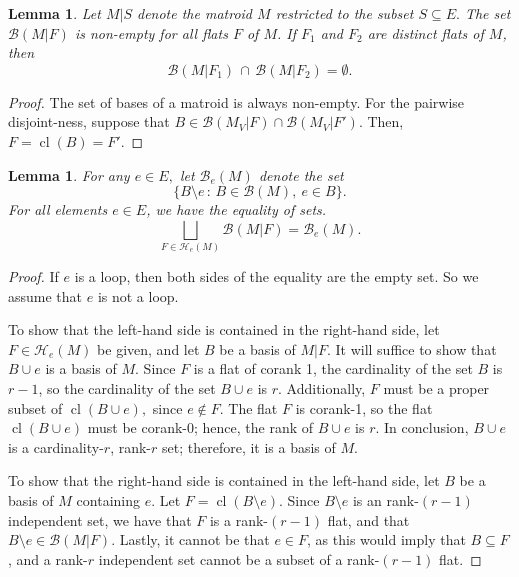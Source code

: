 \documentclass{amsart}
\theoremstyle{plain}
\newtheorem{lemma}[theorem]{Lemma}
\theoremstyle{definition}
\newcommand{\cl}{\operatorname{cl}}
\begin{document}
\begin{lemma}
\label{lem:matroid_pairwise_disjoint}
Let $M | S$ denote the matroid $M$ restricted to the subset $S \subseteq E.$ The set $\mathcal{B}(M|F)$ is non-empty for all flats $F$ of $M$.
If $F_1$ and $F_2$ are distinct flats of $M$, then
\[\mathcal{B}(M | F_1) \, \cap \, \mathcal{B}(M | F_2) = \emptyset.\]
\end{lemma}

\begin{proof}
The set of bases of a matroid is always non-empty. For the pairwise disjoint-ness, suppose that $B\in \mathcal{B}(M_V | F) \cap \mathcal{B}(M_V | F') $. Then, $F = \cl(B) = F'.$
\end{proof}

\begin{lemma}
\label{lem:matroid_set_equality}
For any $e \in E,$ let $\mathcal{B}_e(M)$ denote the set
\[\{B \setminus e \, : \, B \in \mathcal{B}(M), \: e\in B\}.\]
For all elements $e \in E$, we have the equality of sets.
\begin{equation*}
\label{eq:matroid_set_equality}
\bigsqcup_{F \in \mathcal{H}_e(M)} \mathcal{B}(M | F) = \mathcal{B}_e(M).
\end{equation*}
\end{lemma}

\begin{proof}

    If $e$ is a loop, then both sides of the equality are the empty set. So we assume that $e$ is not a loop.

    To show that the left-hand side is contained in the right-hand side, let $F \in \mathcal{H}_e(M)$ be given, and let $B$ be a basis of $M | F$. It will suffice to show that $B\cup e$ is a basis of $M$. Since $F$ is a flat of corank 1, the cardinality of the set $B$ is $r-1$, so the cardinality of the set $B \cup e$ is $r$. Additionally, $F$ must be a proper subset of $\cl(B \cup e),$ since $e \notin F$. The flat $F$ is corank-1, so the flat $\cl(B \cup e)$ must be corank-0; hence, the rank of $B \cup e$ is $r$. In conclusion, $B\cup e$ is a cardinality-$r$, rank-$r$ set; therefore, it is a basis of $M$.

    To show that the right-hand side is contained in the left-hand side, let $B$ be a basis of 
    $M$ containing $e$. Let $F = \cl(B \setminus e).$ Since $B \setminus e$ is an rank-$(r-1)$ independent set, we have that $F$ is a rank-$(r-1)$ flat, and that $B \setminus e \in \mathcal{B}(M|F)$. Lastly, it cannot be that $e \in F$, as this would imply that $B \subseteq F$, and a rank-$r$ independent set cannot be a subset of a rank-$(r-1)$ flat.
\end{proof}
\end{document}
